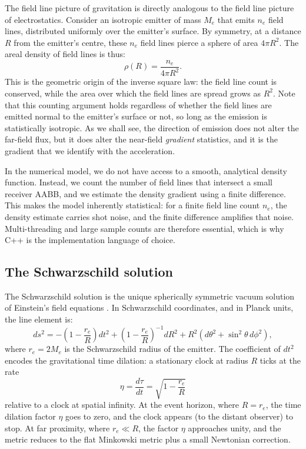 \documentclass[10pt]{article}
\begin{document}
The field line picture of gravitation is directly analogous to the field line picture of electrostatics.
Consider an isotropic emitter of mass $M_e$ that emits $n_e$ field lines, distributed uniformly over the emitter's surface.
By symmetry, at a distance $R$ from the emitter's centre, these $n_e$ field lines pierce a sphere of area $4 \pi R^2$.
The areal density of field lines is thus:
\begin{equation}
\rho(R) = \frac{n_e}{4 \pi R^2}.
\end{equation}
This is the geometric origin of the inverse square law: the field line count is conserved, while the area over which the field lines are spread grows as $R^2$.
Note that this counting argument holds regardless of whether the field lines are emitted normal to the emitter's surface or not, so long as the emission is statistically isotropic.
As we shall see, the direction of emission does not alter the far-field flux, but it does alter the near-field {\em gradient} statistics, and it is the gradient that we identify with the acceleration.

In the numerical model, we do not have access to a smooth, analytical density function.
Instead, we count the number of field lines that intersect a small receiver AABB, and we estimate the density gradient using a finite difference.
This makes the model inherently statistical: for a finite field line count $n_e$, the density estimate carries shot noise, and the finite difference amplifies that noise.
Multi-threading and large sample counts are therefore essential, which is why C++ is the implementation language of choice.

\subsection{The Schwarzschild solution}

The Schwarzschild solution is the unique spherically symmetric vacuum solution of Einstein's field equations \cite{misner}.
In Schwarzschild coordinates, and in Planck units, the line element is:
\begin{equation}
ds^2 = -\left(1 - \frac{r_e}{R}\right) dt^2 + \left(1 - \frac{r_e}{R}\right)^{-1} dR^2 + R^2 \left( d\theta^2 + \sin^2\theta \, d\phi^2 \right),
\end{equation}
where $r_e = 2 M_e$ is the Schwarzschild radius of the emitter.
The coefficient of $dt^2$ encodes the gravitational time dilation: a stationary clock at radius $R$ ticks at the rate
\begin{equation}
\eta = \frac{d\tau}{dt} = \sqrt{1 - \frac{r_e}{R}}
\end{equation}
relative to a clock at spatial infinity.
At the event horizon, where $R = r_e$, the time dilation factor $\eta$ goes to zero, and the clock appears (to the distant observer) to stop.
At far proximity, where $r_e \ll R$, the factor $\eta$ approaches unity, and the metric reduces to the flat Minkowski metric plus a small Newtonian correction.
\end{document}
